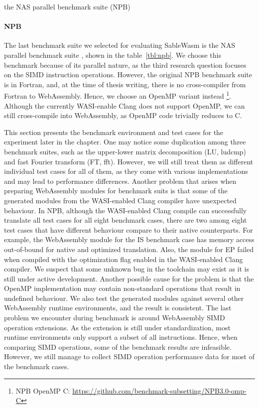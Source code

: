 \begin{table}
    \centering
    
    \caption{the NAS parallel benchmark suite (NPB)}
    \label{tbl:npb}
\end{table}

\paragraph{NPB}
The last benchmark suite we selected for evaluating SableWasm is the NAS parallel benchmark suite \cite{npb}, shown in the table~\ref{tbl:npb}. We choose this benchmark because of its parallel nature, as the third research question focuses on the SIMD instruction operations. However, the original NPB benchmark suite is in Fortran, and, at the time of thesis writing, there is no cross-compiler from Fortran to WebAssembly. Hence, we choose an OpenMP variant instead \footnote{NPB OpenMP C: \url{https://github.com/benchmark-subsetting/NPB3.0-omp-C}}. Although the currently WASI-enable Clang does not support OpenMP, we can still cross-compile into WebAssembly, as OpenMP code trivially reduces to C.

This section presents the benchmark environment and test cases for the experiment later in the chapter. One may notice some duplication among three benchmark suites, such as the upper-lower matrix decomposition (LU, ludcmp) and fast Fourier transform (FT, fft). However, we will still treat them as different individual test cases for all of them, as they come with various implementations and may lead to performance differences. Another problem that arises when preparing WebAssembly modules for benchmark suits is that some of the generated modules from the WASI-enabled Clang compiler have unexpected behaviour. In NPB, although the WASI-enabled Clang compile can successfully translate all test cases for all eight benchmark cases, there are two among eight test cases that have different behaviour compare to their native counterparts. For example, the WebAssembly module for the IS benchmark case has memory access out-of-bound for native and optimized translation. Also, the module for EP failed when compiled with the optimization flag enabled in the WASI-enabled Clang compiler. We suspect that some unknown bug in the toolchain may exist as it is still under active development. Another possible cause for the problem is that the OpenMP implementation may contain non-standard operations that result in undefined behaviour. We also test the generated modules against several other WebAssembly runtime environments, and the result is consistent. The last problem we encounter during benchmark is around WebAssembly SIMD operation extensions. As the extension is still under standardization, most runtime environments only support a subset of all instructions. Hence, when comparing SIMD operations, some of the benchmark results are infeasible. However, we still manage to collect SIMD operation performance data for most of the benchmark cases.

